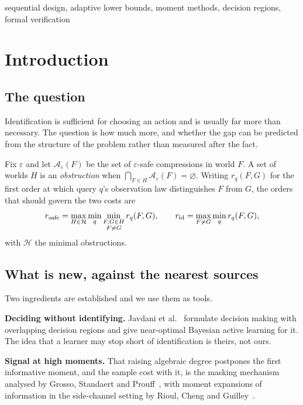 \begin{IEEEkeywords}
sequential design, adaptive lower bounds, moment methods, decision regions, formal
verification
\end{IEEEkeywords}

\section{Introduction}
\label{sec:intro}

\subsection{The question}

Identification is sufficient for choosing an action and is usually far more than necessary.
The question is how much more, and whether the gap can be predicted from the structure of
the problem rather than measured after the fact.

Fix $\varepsilon$ and let $\mathcal{A}_{\varepsilon}(F)$ be the set of $\varepsilon$-safe
compressions in world $F$. A set of worlds $H$ is an \emph{obstruction} when
$\bigcap_{F\in H}\mathcal{A}_{\varepsilon}(F)=\varnothing$. Writing $r_{q}(F,G)$ for the
first order at which query $q$'s observation law distinguishes $F$ from $G$, the orders that
should govern the two costs are
\begin{equation}
r_{\rm safe}=\max_{H\in\mathcal{H}}\min_{q}\min_{\substack{F,G\in H\\F\ne G}}r_{q}(F,G),
\qquad
r_{\rm id}=\max_{F\ne G}\min_{q}r_{q}(F,G),
\label{eq:orders}
\end{equation}
with $\mathcal{H}$ the minimal obstructions.

\subsection{What is new, against the nearest sources}

Two ingredients are established and we use them as tools.

\textbf{Deciding without identifying.} Javdani et al.~\cite{javdani2014} formulate decision
making with overlapping decision regions and give near-optimal Bayesian active learning for
it. The idea that a learner may stop short of identification is theirs, not ours.

\textbf{Signal at high moments.} That raising algebraic degree postpones the first
informative moment, and the sample cost with it, is the masking mechanism analysed by Grosso,
Standaert and Prouff~\cite{grosso2014}, with moment expansions of information in the
side-channel setting by Rioul, Cheng and Guilley~\cite{rioul2021}.

